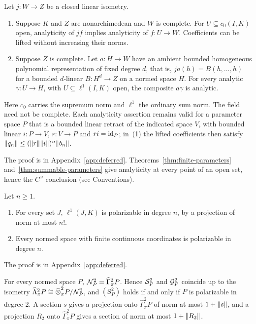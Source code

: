 \begin{theorem}\label{thm:summable-parameters}
Let $j\colon W\to Z$ be a closed linear isometry.
\begin{enumerate}
\item Suppose $K$ and $Z$ are nonarchimedean and $W$ is complete. For $U\subseteq c_0(I,K)$ open, analyticity of $jf$ implies analyticity of $f\colon U\to W$. Coefficients can be lifted without increasing their norms.
\item Suppose $Z$ is complete. Let $a\colon H\to W$ have an ambient bounded homogeneous polynomial representation of fixed degree $d$, that is, $ja(h)=B(h,\ldots,h)$ for a bounded $d$-linear $B\colon H^d\to Z$ on a normed space $H$. For every analytic $\gamma\colon U\to H$, with $U\subseteq\ell^1(I,K)$ open, the composite $a\gamma$ is analytic.
\end{enumerate}
Here $c_0$ carries the supremum norm and $\ell^1$ the ordinary sum norm. The field need not be complete. Each analyticity assertion remains valid for a parameter space $P$ that is a bounded linear retract of the indicated space $V$, with bounded linear $i\colon P\to V$, $r\colon V\to P$ and $ri=\mathrm{id}_P$; in~(1) the lifted coefficients then satisfy $\lVert q_n\rVert\le(\lVert r\rVert\lVert i\rVert)^n\lVert b_n\rVert$.
\end{theorem}
The proof is in Appendix~\ref{app:deferred}. Theorems~\ref{thm:finite-parameters} and~\ref{thm:summable-parameters} give
analyticity at every point of an open set, hence the $C^\omega$ conclusion (see Conventions).

\begin{proposition}\label{spl:prop:gamma-l1}
Let $n\ge1$.
\begin{enumerate}
\item For every set $J$, $\ell^1(J,K)$ is polarizable in degree $n$, by a projection of norm at most $n!$.
\item Every normed space with finite continuous coordinates is polarizable in degree $n$.
\end{enumerate}
\end{proposition}

The proof is in Appendix~\ref{app:deferred}.

\begin{proposition}\label{spl:prop:degree-two}
For every normed space $P$, $\mathcal N^2_P=\widehat\Gamma^2_\pi P$. Hence $\mathcal S^2_P$ and $\mathcal G^2_P$ coincide up to the isometry
$\widehat\Lambda^2_\pi P\cong\widehat\otimes^2_\pi P/\mathcal N^2_P$, and $(\mathrm S^2_P)$ holds if and only if $P$ is
polarizable in degree $2$. A section $s$ gives a projection onto $\widehat\Gamma^2_\pi P$ of norm at most $1+\lVert s\rVert$, and
a projection $R_2$ onto $\widehat\Gamma^2_\pi P$ gives a section of norm at most $1+\lVert R_2\rVert$.
\end{proposition}

